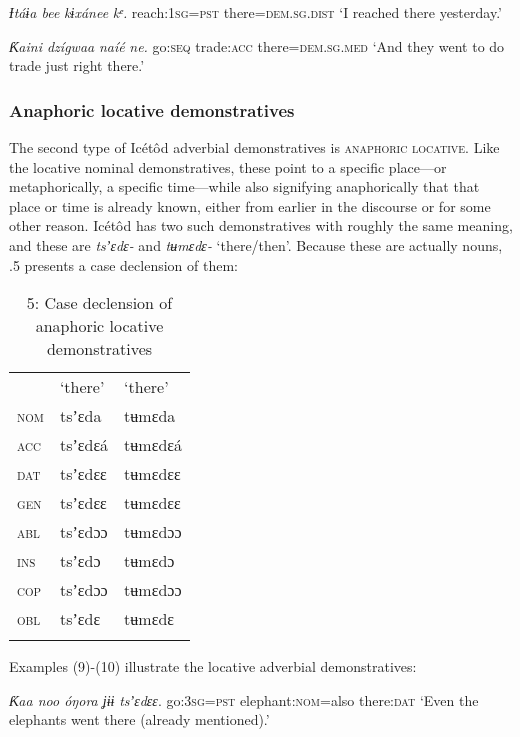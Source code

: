\textit{Ɨ}\textit{táɨa bee     }\textit{kɨxánee}\textit{ kᵉ.}
reach:\textsc{1sg}=\textsc{pst}   there=\textsc{dem.sg.dist}
‘I reached there yesterday.’




\textit{Ƙ}\textit{aini   dzígwaa   }\textit{naíé}\textit{ ne.}
go:\textsc{seq}   trade:\textsc{acc}   there=\textsc{dem.sg.med}
‘And they went to do trade just right there.’




\subsubsection{Anaphoric locative demonstratives}

The second type of Icétôd adverbial demonstratives is \textsc{anaphoric} \textsc{locative}. Like the locative nominal demonstratives, these point to a specific place—or metaphorically, a specific time—while also signifying anaphorically that that place or time is already known, either from earlier in the discourse or for some other reason. Icétôd has two such demonstratives with roughly the same meaning, and these are \textit{tsʼɛdɛ- }and \textit{tʉmɛdɛ- }‘there/then’. Because these are actually nouns, .5 presents a case declension of them:


\begin{table}
\caption{5: Case declension of anaphoric locative demonstratives}
\label{tab:6}


\begin{tabularx}{\textwidth}{XXX} & ‘there’ & ‘there’\\
\lsptoprule
\textsc{nom} & tsʼɛda & tʉmɛda\\
\textsc{acc} & tsʼɛdɛá & tʉmɛdɛá\\
\textsc{dat} & tsʼɛdɛɛ & tʉmɛdɛɛ\\
\textsc{gen} & tsʼɛdɛɛ & tʉmɛdɛɛ\\
\textsc{abl} & tsʼɛdɔɔ & tʉmɛdɔɔ\\
\textsc{ins} & tsʼɛdɔ & tʉmɛdɔ\\
\textsc{cop} & tsʼɛdɔɔ & tʉmɛdɔɔ\\
\textsc{obl} & tsʼɛdɛ & tʉmɛdɛ\\
\lspbottomrule
\end{tabularx}
\end{table}
Examples (9)-(10) illustrate the locative adverbial demonstratives:




\textit{Ƙ}\textit{aa noo   óŋora ʝɨɨ     }\textit{tsʼɛdɛɛ}.
go:\textsc{3sg=pst}   elephant:\textsc{nom}=also   there:\textsc{dat}
‘Even the elephants went there (already mentioned).’




